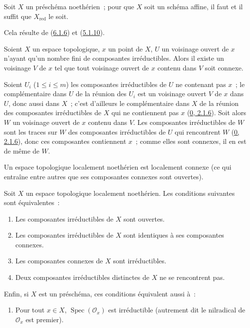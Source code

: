 \begin{corollary}[6.1.7]
\label{I.6.1.7-fr}
Soit $X$ un préschéma noethérien~; pour que $X$ soit un schéma affine, il faut
et il suffit que $X_{\mathrm{red}}$ le soit.
\end{corollary}

Cela résulte de (\hyperref[I.6.1.6-fr]{6.1.6}) et
(\hyperref[I.5.1.10-fr]{5.1.10}).

\begin{lemma}[6.1.8]
\label{I.6.1.8-fr}
Soient $X$ un espace topologique, $x$ un point de $X$, $U$ un voisinage ouvert
de $x$ n'ayant qu'un nombre fini de composantes irréductibles. Alors il existe
un voisinage $V$ de $x$ tel que tout voisinage ouvert de $x$ contenu dans $V$
soit connexe.
\end{lemma}

Soient $U_i$ ($1\leq i\leq m$) les composantes irréductibles de $U$ ne
contenant pas $x$~; le complémentaire dans $U$ de la réunion des $U_i$ est un
voisinage ouvert $V$ de $x$ dans $U$, donc aussi dans $X$~; c'est d'ailleurs
le complémentaire dans $X$ de la réunion des composantes irréductibles de $X$
qui ne contiennent pas $x$ (\hyperref[0.2.1.6-fr]{0, 2.1.6}). Soit alors $W$
un voisinage ouvert de $x$ contenu dans $V$. Les composantes irréductibles de
$W$ sont les traces sur $W$ des composantes irréductibles de $U$ qui
rencontrent $W$ (\hyperref[0.2.1.6-fr]{0, 2.1.6}), donc ces composantes
contiennent $x$~; comme elles sont connexes, il en est de même de $W$.

\begin{corollary}[6.1.9]
\label{I.6.1.9-fr}
Un espace topologique localement noethérien est localement connexe (ce qui
entraîne entre autres que ses composantes connexes sont ouvertes).
\end{corollary}

\begin{proposition}[6.1.10]
\label{I.6.1.10-fr}
Soit $X$ un espace topologique localement noethérien. Les conditions suivantes
sont équivalentes~:
\begin{enumerate}
  \item[a)] Les composantes irréductibles de $X$ sont ouvertes.
  \item[b)] Les composantes irréductibles de $X$ sont identiques à ses
    composantes connexes.
  \item[c)] Les composantes connexes de $X$ sont irréductibles.
  \item[d)] Deux composantes irréductibles distinctes de $X$ ne se rencontrent
    pas.
\end{enumerate}

Enfin, si $X$ est un préschéma, ces conditions équivalent aussi à~:
\begin{enumerate}
  \item[e)] Pour tout $x\in X$, $\operatorname{Spec}(\mathscr{O}_x)$ est
    irréductible (autrement dit le nilradical de $\mathscr{O}_x$ est premier).
\end{enumerate}
\end{proposition}

